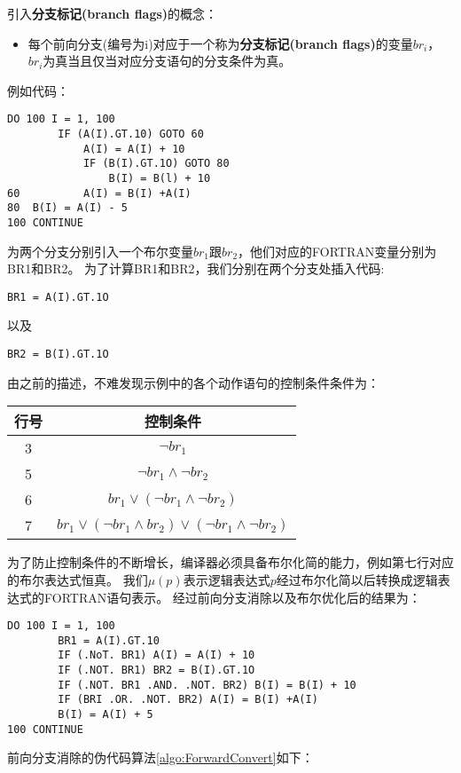 \documentclass[11pt,a4paper]{article}
\begin{document}
引入\textbf{分支标记(branch flags)}的概念：
\begin{itemize}
\item 每个前向分支(编号为i)对应于一个称为\textbf{分支标记(branch flags)}的变量$br_i$，$br_i$为真当且仅当对应分支语句的分支条件为真。
\end{itemize}

例如代码：

\begin{lstlisting}[language=FORTRAN]
	DO 100 I = 1, 100
		IF (A(I).GT.10) GOTO 60
			A(I) = A(I) + 10
			IF (B(I).GT.1O) GOTO 80
				B(I) = B(l) + 10
60			A(I) = B(I) +A(I)
80	B(I) = A(I) - 5
100	CONTINUE 
\end{lstlisting}

为两个分支分别引入一个布尔变量$br_1$跟$br_2$，他们对应的FORTRAN变量分别为BR1和BR2。
为了计算BR1和BR2，我们分别在两个分支处插入代码:
\begin{lstlisting}[language=FORTRAN]
BR1 = A(I).GT.1O
\end{lstlisting}
以及
\begin{lstlisting}[language=FORTRAN]
BR2 = B(I).GT.1O
\end{lstlisting}

由之前的描述，不难发现示例中的各个动作语句的控制条件条件为：

\begin{tabular}{|c|c|}
\hline
行号	&	控制条件																					\\
\hline
3	&	$\neg br_1$																				\\
5	&	$\neg br_1 \wedge\neg br_2$																\\
6	&	$br_1\vee\left(\neg br_1 \wedge\neg br_2\right)$										\\
7	&	$br_1\vee\left(\neg br_1 \wedge br_2\right)\vee\left(\neg br_1 \wedge\neg br_2\right)$	\\
\hline
\end{tabular}

为了防止控制条件的不断增长，编译器必须具备布尔化简的能力，例如第七行对应的布尔表达式恒真。
我们$\mu\left(p\right)$表示逻辑表达式$p$经过布尔化简以后转换成逻辑表达式的FORTRAN语句表示。
经过前向分支消除以及布尔优化后的结果为：

\begin{lstlisting}[language=FORTRAN]
	DO 100 I = 1, 100
		BR1 = A(I).GT.10
		IF (.NoT. BR1) A(I) = A(I) + 10
		IF (.NOT. BR1) BR2 = B(I).GT.1O
		IF (.NOT. BR1 .AND. .NOT. BR2) B(I) = B(I) + 10
		IF (BRI .OR. .NOT. BR2) A(I) = B(I) +A(I)
		B(I) = A(I) + 5
100	CONTINUE
\end{lstlisting}
前向分支消除的伪代码算法\ref{algo:ForwardConvert}如下：
\end{document}
